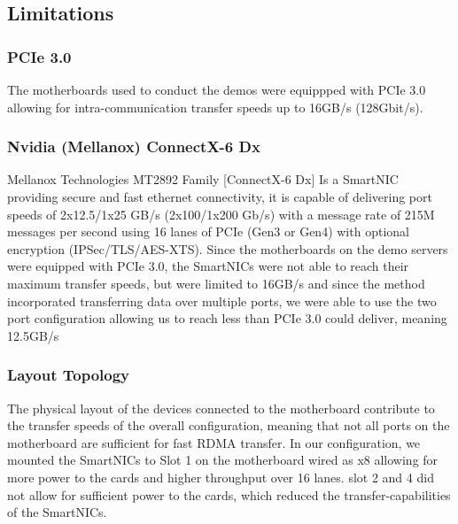 \documentclass[a4paper,onecolumn]{article}
\begin{document}
\subsection{Limitations}

\subsubsection{PCIe 3.0}
The motherboards used to conduct the demos were equippped with PCIe 3.0 \cite{article_dell_motherboard} allowing for intra-communication transfer speeds up to 16GB/s (128Gbit/s). 

\subsubsection{Nvidia (Mellanox) ConnectX-6 Dx}
Mellanox Technologies MT2892 Family [ConnectX-6 Dx]
Is a SmartNIC providing secure and fast ethernet connectivity, it is capable of delivering port speeds of 2x12.5/1x25 GB/s (2x100/1x200 Gb/s) with a message rate of 215M messages per second using 16 lanes of PCIe (Gen3 or Gen4) with optional encryption (IPSec/TLS/AES-XTS). Since the motherboards on the demo servers were equipped with PCIe 3.0, the SmartNICs were not able to reach their maximum transfer speeds, but were limited to 16GB/s and since the method incorporated transferring data over multiple ports, we were able to use the two port configuration allowing us to reach less than PCIe 3.0 could deliver, meaning 12.5GB/s


\subsubsection{Layout Topology}
The physical layout of the devices connected to the motherboard contribute to the transfer speeds of the overall configuration, meaning that not all ports on the motherboard are sufficient for fast RDMA transfer. In our configuration, we mounted the SmartNICs to Slot 1 on the motherboard wired as x8 allowing for more power to the cards and higher throughput over 16 lanes. slot 2 and 4 did not allow for sufficient power to the cards, which reduced the transfer-capabilities of the SmartNICs.
\end{document}
